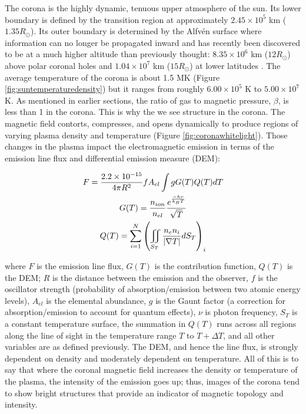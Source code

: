 The corona is the highly dynamic, tenuous upper atmosphere of the sun. Its lower boundary is defined by the transition region at approximately $2.45 \times 10^5$ km ($1.35 R_\odot$). Its outer boundary is determined by the Alfvén surface where information can no longer be propagated inward and has recently been discovered to be at a much higher altitude than previously thought: $8.35 \times 10^6$ km ($12 R_\odot$) above polar coronal holes and $1.04 \times 10^7$ km ($15 R_\odot$) at lower latitudes \citep{DeForest2014}. The average temperature of the corona is about 1.5 MK (Figure \ref{fig:suntemperaturedensity}) but it ranges from roughly $6.00 \times 10^5$ K to $5.00 \times 10^7$ K. As mentioned in earlier sections, the ratio of gas to magnetic pressure, $\beta$, is less than 1 in the corona. This is why the we see structure in the corona. The magnetic field contorts, compresses, and opens dynamically to produce regions of varying plasma density and temperature (Figure \ref{fig:coronawhitelight}). Those changes in the plasma impact the electromagnetic emission in terms of the emission line flux and differential emission measure (DEM): 

\begin{gather}
    \label{eq:emissionmeasure}
    F = \frac{2.2 \times 10^{-15}}{4\pi R^2}fA_{el} \int gG(T)Q(T)dT \\
    G(T) = \frac{n_{ion}}{n_{el}}\frac{e^{\frac{-h\nu}{k_BT}}}{\sqrtsign{T}} \\
    Q(T) = \sum_{i=1}^N \left(\iint_{S_T} \frac{n_e n_i}{\left|\nabla T\right|} dS_T \right)_i
\end{gather}

\noindent where $F$ is the emission line flux, $G(T)$ is the contribution function, $Q(T)$ is the DEM; $R$ is the distance between the emission and the observer, $f$ is the oscillator strength (probability of absorption/emission between two atomic energy levels), $A_{el}$ is the elemental abundance, $g$ is the Gaunt factor (a correction for absorption/emission to account for quantum effects), $\nu$ is photon frequency, $S_T$ is a constant temperature surface, the summation in $Q(T)$ runs across all regions along the line of sight in the temperature range $T$ to $T + \Delta T$, and all other variables are as defined previously. The DEM, and hence the line flux, is strongly dependent on density and moderately dependent on temperature. All of this is to say that where the coronal magnetic field increases the density or temperature of the plasma, the intensity of the emission goes up; thus, images of the corona tend to show bright structures that provide an indicator of magnetic topology and intensity. 

